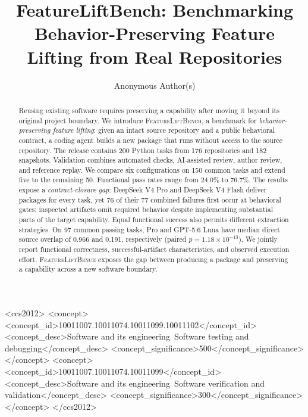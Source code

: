 \documentclass[acmsmall,screen,review,anonymous,nonacm]{acmart}
\newcommand{\flb}{\textsc{FeatureLiftBench}\xspace}
\begin{document}
\title[FeatureLiftBench: Behavior-Preserving Feature Lifting]{FeatureLiftBench: Benchmarking Behavior-Preserving Feature Lifting from Real Repositories}
\author{Anonymous Author(s)}

\begin{abstract}
Reusing existing software requires preserving a capability after moving it
beyond its original project boundary. We introduce \flb, a benchmark for
\emph{behavior-preserving feature lifting}: given an intact source repository
and a public behavioral contract, a coding agent builds a new package that
runs without access to the source repository. The release contains 200 Python
tasks from 176 repositories and 182 snapshots. Validation combines automated
checks, AI-assisted review, author review, and reference replay.
We compare six configurations on 150 common tasks and extend five to the
remaining 50. Functional pass rates range from 24.0\% to 76.7\%.
The results expose a \emph{contract-closure gap}: DeepSeek V4 Pro and
DeepSeek V4 Flash deliver packages for every task, yet 76 of their 77 combined
failures first occur at behavioral gates; inspected artifacts omit required
behavior despite implementing substantial parts of the target capability.
Equal functional success also permits different extraction strategies.
On 97 common passing tasks, Pro and GPT-5.6 Luna have median direct source
overlap of 0.966 and 0.191, respectively (paired $p=1.18\times10^{-13}$).
We jointly report functional correctness, successful-artifact characteristics,
and observed execution effort. \flb exposes the gap between producing a
package and preserving a capability across a new software boundary.

\end{abstract}

\begin{CCSXML}
<ccs2012>
 <concept><concept_id>10011007.10011074.10011099.10011102</concept_id>
 <concept_desc>Software and its engineering~Software testing and debugging</concept_desc>
 <concept_significance>500</concept_significance></concept>
 <concept><concept_id>10011007.10011074.10011099</concept_id>
 <concept_desc>Software and its engineering~Software verification and validation</concept_desc>
 <concept_significance>300</concept_significance></concept>
</ccs2012>
\end{CCSXML}
\maketitle
\end{document}

